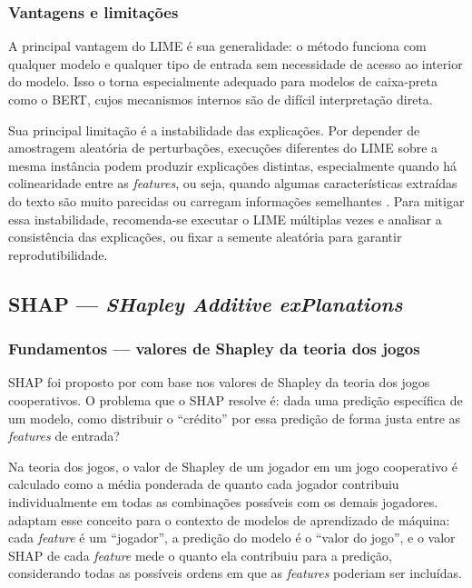 \documentclass[
    12pt,                %
    openright,           %
    oneside,             %
    a4paper,             %
    english,             %
    brazil               %
]{abntex2}
\begin{document}
\subsubsection{Vantagens e limitações}
\label{subsubsec:lime_limitacoes}

A principal vantagem do LIME é sua generalidade: o método funciona com qualquer modelo e qualquer tipo de entrada sem necessidade de acesso ao interior do modelo. Isso o torna especialmente adequado para modelos de caixa-preta como o BERT, cujos mecanismos internos são de difícil interpretação direta.

Sua principal limitação é a instabilidade das explicações. Por 
depender de amostragem aleatória de perturbações, execuções diferentes 
do LIME sobre a mesma instância podem produzir explicações distintas, 
especialmente quando há colinearidade entre as \textit{features}, 
ou seja, quando algumas características extraídas do texto são muito 
parecidas ou carregam informações semelhantes \cite{salih2023}. Para 
mitigar essa instabilidade, recomenda-se executar o LIME múltiplas 
vezes e analisar a consistência das explicações, ou fixar a semente 
aleatória para garantir reprodutibilidade.

\subsection{SHAP — \textit{SHapley Additive exPlanations}}
\label{subsec:shap}

\subsubsection{Fundamentos — valores de Shapley da teoria dos jogos}
\label{subsubsec:shap_fundamentos}

SHAP foi proposto por  com base nos valores 
de Shapley da teoria dos jogos cooperativos. O problema que o SHAP 
resolve é: dada uma predição específica de um modelo, como distribuir 
o ``crédito'' por essa predição de forma justa entre as 
\textit{features} de entrada?

Na teoria dos jogos, o valor de Shapley de um jogador em um jogo 
cooperativo é calculado como a média ponderada de quanto cada jogador 
contribuiu individualmente em todas as combinações possíveis com os 
demais jogadores.  adaptam esse conceito 
para o contexto de modelos de aprendizado de máquina: cada 
\textit{feature} é um ``jogador'', a predição do modelo é o 
``valor do jogo'', e o valor SHAP de cada \textit{feature} mede 
o quanto ela contribuiu para a predição, considerando todas as 
possíveis ordens em que as \textit{features} poderiam ser incluídas.
\end{document}
